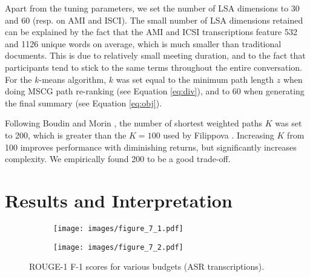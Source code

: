 \documentclass[11pt,a4paper]{article}
\begin{document}
\begin{table}[!ht]
\setlength{\tabcolsep}{3.2pt}
\small
\centering
{}
\caption{Optimal parameter values $n, z, (\lambda, r)$.}
\label{table:optimal_parameters}
\end{table}

Apart from the tuning parameters, we set the number of LSA dimensions to 30 and 60 (resp. on AMI and ISCI). The small number of LSA dimensions retained can be explained by the fact that the AMI and ICSI transcriptions feature 532 and 1126 unique words on average, which is much smaller than traditional documents. This is due to relatively small meeting duration, and to the fact that participants tend to stick to the same terms throughout the entire conversation. For the $k$-means algorithm, $k$ was set equal to the minimum path length $z$ when doing MSCG path re-ranking (see Equation \ref{eq:div}), and to 60 when generating the final summary (see Equation \ref{eq:obj}).

Following Boudin and Morin , the number of shortest weighted paths $K$ was set to 200, which is greater than the $K=100$ used by Filippova . Increasing $K$ from 100 improves performance with diminishing returns, but significantly increases complexity. We empirically found 200 to be a good trade-off.

\section{Results and Interpretation}

\begin{figure*}[ht]
\centering
\begin{subfigure}[t]{0.49\textwidth}
\centering
\texttt{[image: images/figure\_7\_1.pdf]}
\end{subfigure}
\begin{subfigure}[t]{0.49\textwidth}
\centering
\texttt{[image: images/figure\_7\_2.pdf]}
\end{subfigure}
\caption{ROUGE-1 F-1 scores for various budgets (ASR transcriptions).}
\label{fig:res}
\end{figure*}
\end{document}
